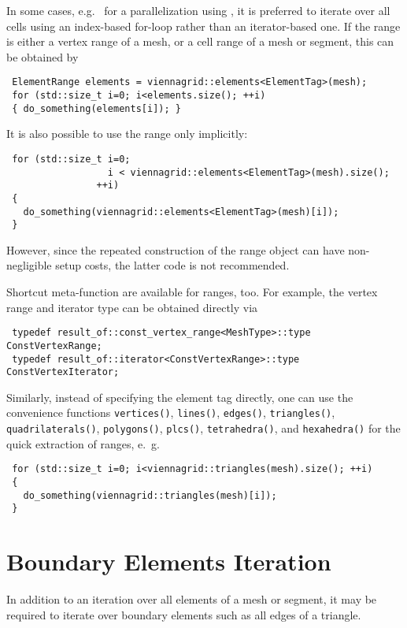 In some cases, e.g.~ for a parallelization using \OpenMP \cite{openmp}, it is preferred to iterate over all cells using an index-based for-loop rather than an iterator-based one.
If the range is either a vertex range of a mesh, or a cell range of a mesh or segment, this can be obtained by
\begin{lstlisting}
 ElementRange elements = viennagrid::elements<ElementTag>(mesh);
 for (std::size_t i=0; i<elements.size(); ++i)
 { do_something(elements[i]); }
\end{lstlisting}
It is also possible to use the range only implicitly:
\begin{lstlisting}
 for (std::size_t i=0;
                  i < viennagrid::elements<ElementTag>(mesh).size();
                ++i)
 {
   do_something(viennagrid::elements<ElementTag>(mesh)[i]);
 }
\end{lstlisting}
However, since the repeated construction of the range object can have non-negligible setup costs, the latter code is not recommended.


Shortcut meta-function are available for ranges, too.
For example, the vertex range and iterator type can be obtained directly via
\begin{lstlisting}
 typedef result_of::const_vertex_range<MeshType>::type ConstVertexRange;
 typedef result_of::iterator<ConstVertexRange>::type   ConstVertexIterator;
\end{lstlisting}
Similarly, instead of specifying the element tag directly, one can use the convenience functions
\lstinline|vertices()|, \lstinline|lines()|, \lstinline|edges()|, \lstinline|triangles()|, \lstinline|quadrilaterals()|, \lstinline|polygons()|, \lstinline|plcs()|, \lstinline|tetrahedra()|, and \lstinline|hexahedra()| for the quick extraction of ranges, e.~g.
\begin{lstlisting}
 for (std::size_t i=0; i<viennagrid::triangles(mesh).size(); ++i)
 {
   do_something(viennagrid::triangles(mesh)[i]);
 }
\end{lstlisting}

\section{Boundary Elements Iteration}
In addition to an iteration over all elements of a mesh or segment, it may be required to iterate over boundary elements such as all edges of a triangle.

